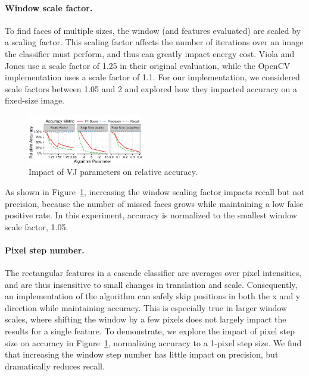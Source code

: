 \paragraph{Window scale factor.}
To find faces of
multiple sizes, the window (and features evaluated) are scaled by a scaling factor. This scaling factor
affects the number of iterations over an image the classifier must perform, and thus can greatly impact
energy cost. Viola and Jones use a scale factor of 1.25 in their original evaluation, while the OpenCV
implementation uses a scale factor of 1.1. For our implementation, we considered scale factors between 1.05
and 2 and explored how they impacted accuracy on a fixed-size image.

\begin{figure}[h]
\noindent
\centering
    \begin{center}
      \includegraphics[width=0.45\textwidth]{nsp-figs/vj_algo_accuracy.pdf}
    \end{center}
    \caption{Impact of VJ parameters on relative accuracy.}
    \label{fig:vj-accuracy}

\end{figure}

As shown in Figure~\ref{fig:vj-accuracy}, increasing the window scaling factor impacts recall but not precision,
because the number of missed faces grows while maintaining a low false positive rate. In this experiment, accuracy is normalized to the smallest window scale factor, 1.05.

\paragraph{Pixel step number.}
The rectangular features in a cascade classifier are averages over pixel intensities,
and are thus insensitive to small changes in translation and scale. Consequently,
an implementation of the algorithm can safely skip positions in both the x and y direction while
maintaining accuracy. This is especially true in larger window scales, where shifting the window
by a few pixels does not largely impact the results for a single feature.
To demonstrate, we explore the impact of pixel step size on accuracy in Figure~\ref{fig:vj-accuracy}, normalizing
accuracy to a 1-pixel step size.  We find that increasing the window step number has little
impact on precision, but dramatically reduces recall.

